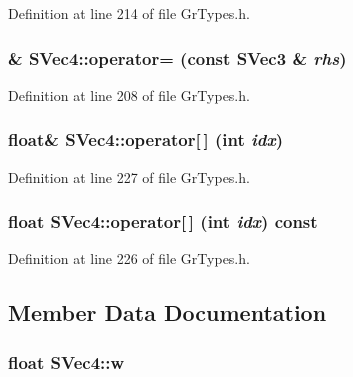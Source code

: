 Definition at line 214 of file GrTypes.h.\hypertarget{struct_s_vec4_7d79784e22140bfa5730ed822ec48828}{
\subsubsection[{operator=}]{\& SVec4::operator= (const {\bf SVec3} \& {\em rhs})}}
\label{struct_s_vec4_7d79784e22140bfa5730ed822ec48828}




Definition at line 208 of file GrTypes.h.\hypertarget{struct_s_vec4_3d663590290a7baca7adade6ff5c040c}{
\subsubsection[{operator[]}]{\setlength{\rightskip}{0pt plus 5cm}float\& SVec4::operator\mbox{[}$\,$\mbox{]} (int {\em idx})}}
\label{struct_s_vec4_3d663590290a7baca7adade6ff5c040c}




Definition at line 227 of file GrTypes.h.\hypertarget{struct_s_vec4_d565153f964a379147ae31aa8dfcde5b}{
\subsubsection[{operator[]}]{\setlength{\rightskip}{0pt plus 5cm}float SVec4::operator\mbox{[}$\,$\mbox{]} (int {\em idx}) const}}
\label{struct_s_vec4_d565153f964a379147ae31aa8dfcde5b}




Definition at line 226 of file GrTypes.h.

\subsection{Member Data Documentation}
\hypertarget{struct_s_vec4_27c9c543518d87d4e7f0ace5487352d7}{
\subsubsection[{w}]{\setlength{\rightskip}{0pt plus 5cm}float {\bf SVec4::w}}}
\label{struct_s_vec4_27c9c543518d87d4e7f0ace5487352d7}




